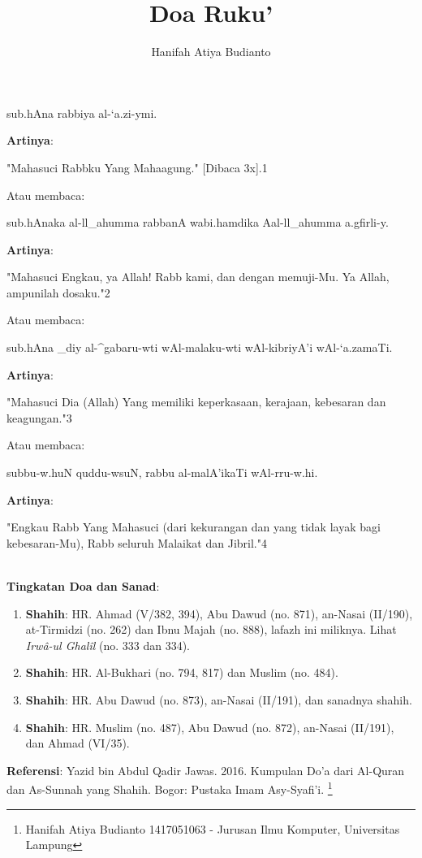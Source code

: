 \documentclass[a4paper,12pt]{article}
\title{\Large Doa Ruku'}
\author{\calligra Hanifah Atiya Budianto}
\begin{document}
\sffamily
\maketitle 
\fullvocalize
{}
\begin{arabtext}
\noindent
sub.hAna rabbiya al-`a.zi-ymi.\\
\end{arabtext}
\noindent
\textbf{Artinya}:
\par
\indent
"Mahasuci Rabbku Yang Mahaagung." [Dibaca 3x].{\scriptsize 1}\\
\par
\indent
Atau membaca:
\begin{arabtext}
\noindent
sub.hAnaka al-ll_ahumma rabbanA wabi.hamdika Aal-ll_ahumma a.gfirli-y.\\
\end{arabtext}
\noindent
\textbf{Artinya}:
\par
\indent
"Mahasuci Engkau, ya Allah! Rabb kami, dan dengan memuji-Mu. Ya Allah, 
ampunilah dosaku."{\scriptsize 2}\\
\par
\indent
Atau membaca:
\begin{arabtext}
\noindent
sub.hAna _diy al-^gabaru-wti wAl-malaku-wti wAl-kibriyA'i wAl-`a.zamaTi.\\
\end{arabtext}
\noindent
\textbf{Artinya}:
\par
\indent
"Mahasuci Dia (Allah) Yang memiliki keperkasaan, kerajaan, kebesaran dan 
keagungan."{\scriptsize 3}\\
\par
\indent
Atau membaca:
\begin{arabtext}
\noindent
subbu-w.huN quddu-wsuN, rabbu al-malA'ikaTi wAl-rru-w.hi.\\
\end{arabtext}
\noindent
\textbf{Artinya}:
\par
\indent
"Engkau Rabb Yang Mahasuci (dari kekurangan dan yang tidak layak bagi 
kebesaran-Mu), Rabb seluruh Malaikat dan Jibril."{\scriptsize 4}\\\\
\par
\noindent
\textbf{Tingkatan Doa dan Sanad}: 
\begin{enumerate}
\item \textbf{Shahih}: HR. Ahmad (V/382, 394), Abu Dawud (no. 871), 
an-Nasai (II/190), at-Tirmidzi (no. 262) dan Ibnu Majah (no. 888), lafazh 
ini miliknya. Lihat \textit{Irw\^{a}-ul Ghal\^{i}l} (no. 333 dan 334).
\item \textbf{Shahih}: HR. Al-Bukhari (no. 794, 817) dan Muslim (no. 484).
\item \textbf{Shahih}: HR. Abu Dawud (no. 873), an-Nasai (II/191), dan 
sanadnya shahih.
\item \textbf{Shahih}: HR. Muslim (no. 487), Abu Dawud (no. 872), an-Nasai 
(II/191), dan Ahmad (VI/35).
\end{enumerate}
\textbf{Referensi}: Yazid bin Abdul Qadir Jawas. 2016. Kumpulan Do'a dari
Al-Quran dan As-Sunnah yang Shahih. Bogor: Pustaka Imam Asy-Syafi'i.
\footnote{Hanifah Atiya Budianto 1417051063 - Jurusan Ilmu Komputer,
Universitas Lampung}
\end{document}
